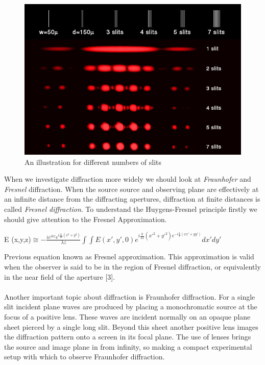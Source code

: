 \documentclass[a4paper,12pt]{report}
\begin{document}
\begin{figure}[h!]
\centering
\includegraphics[width=0.8\linewidth, height=0.32\textheight]{diffraction}
\caption{An illustration for different numbers of slits}
\label{fig:diffraction}
\end{figure}
When we investigate diffraction more widely we should look at \textit{Fraunhofer} and \textit{Fresnel} diffraction. When the source source and observing plane are effectively at an infinite distance from the diffracting apertures, diffraction at finite distances is called \textit{Fresnel diffraction}. To understand the Huygens-Fresnel principle firstly we should give attention to the Fresnel Approximation. 
\begin{center}
	E (x,y,z)$\cong - \frac{ie^{ikz}e^{i\frac{k}{2z}(x^{2}+y^{2})}}{\lambda z}\int\int E(x',y',0)e^{i\frac{k}{2z}(x'^{2}+y'^{2})e^{-i\frac{k}{z}(xx'+yy')}}dx'dy'$ 
\end{center}
Previous equation known as Fresnel approximation. This approximation is valid when the observer is said to be in the region of Fresnel diffraction, or equivalently in the near field of the aperture [3].\\\\
Another important topic about diffraction is Fraunhofer diffraction. For a single slit incident plane waves are produced by placing
a monochromatic source at the focus of a positive lens. These waves are
incident normally on an opaque plane sheet pierced by a single long slit.
Beyond this sheet another positive lens images the diffraction pattern
onto a screen in its focal plane. The use of lenses brings the source and
image plane in from infinity, so making a compact experimental setup
with which to observe Fraunhofer diffraction. 
\end{document}
